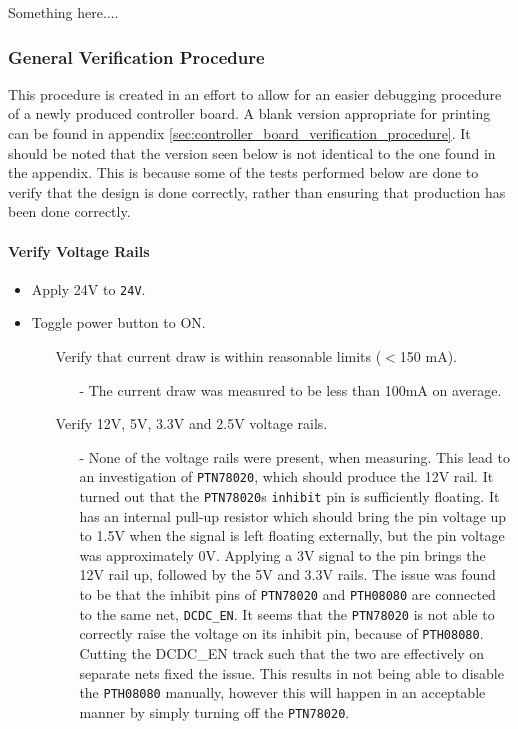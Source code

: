 Something here....

\subsubsection{General Verification Procedure} %
\label{ssub:verification_procedure}
This procedure is created in an effort to allow for an easier debugging procedure of a newly produced controller board.
A blank version appropriate for printing can be found in appendix \ref{sec:controller_board_verification_procedure}.
It should be noted that the version seen below is not identical to the one found in the appendix.
This is because some of the tests performed below are done to verify that the design is done correctly, rather than ensuring that production has been done correctly.
\paragraph{Verify Voltage Rails} %
\label{par:verify_voltage_rails}

\begin{itemize}
 	\item Apply 24V to \texttt{24V}.
 	\item Toggle power button to ON.
 	\begin{itemize}
 		\item[\cmark] Verify that current draw is within reasonable limits ($<$150 mA).
 			\begin{itemize}
 				\item[-] The current draw was measured to be less than 100mA on average. 
 			\end{itemize}
 		\item[\xmark] Verify 12V, 5V, 3.3V and 2.5V voltage rails.
 			\begin{itemize}
 				\item[-] None of the voltage rails were present, when measuring.
 				This lead to an investigation of \texttt{PTN78020}, which should produce the 12V rail. 
 				It turned out that the \texttt{PTN78020}s \texttt{inhibit} pin is sufficiently floating.
 				It has an internal pull-up resistor which should bring the pin voltage up to 1.5V when the signal is left floating externally, but the pin voltage was approximately 0V.
 				Applying a 3V signal to the pin brings the 12V rail up, followed by the 5V and 3.3V rails.
 				The issue was found to be that the inhibit pins of \texttt{PTN78020} and \texttt{PTH08080} are connected to the same net, \texttt{DCDC\_EN}.
 				It seems that the \texttt{PTN78020} is not able to correctly raise the voltage on its inhibit pin, because of \texttt{PTH08080}. 
 				Cutting the DCDC\_EN track such that the two are effectively on separate nets fixed the issue.
            	This results in not being able to disable the \texttt{PTH08080} manually, however this will happen in an acceptable manner by simply turning off the \texttt{PTN78020}.
 			\end{itemize}
 	\end{itemize}
 \end{itemize}

